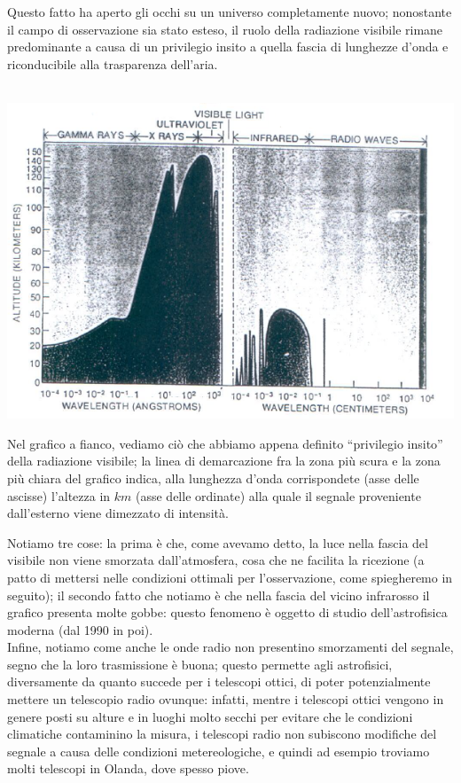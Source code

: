 Questo fatto ha aperto gli occhi su un universo completamente nuovo; nonostante il campo di osservazione sia stato esteso, il ruolo della radiazione visibile rimane predominante a causa di un privilegio insito a quella fascia di lunghezze d'onda e riconducibile alla trasparenza dell'aria.
\\
\\
\begin{minipage}{.50\textwidth}
	\centering
	\includegraphics[width=1\textwidth]{Img/bertin_2.png}
\end{minipage}
\begin{minipage}{.50\textwidth}
	Nel grafico a fianco, vediamo ciò che abbiamo appena definito ``privilegio insito'' della radiazione visibile; la linea di demarcazione fra la zona più scura e la zona più chiara del grafico indica, alla lunghezza d'onda corrispondete (asse delle ascisse) l'altezza in $km$ (asse delle ordinate) alla quale il segnale proveniente dall'esterno viene dimezzato di intensità.
\end{minipage}

\vspace{0.2cm}

Notiamo tre cose: la prima è che, come avevamo detto, la luce nella fascia del visibile non viene smorzata dall'atmosfera, cosa che ne facilita la ricezione (a patto di mettersi nelle condizioni ottimali per l'osservazione, come spiegheremo in seguito); il secondo fatto che notiamo è che nella fascia del vicino infrarosso il grafico presenta molte gobbe: questo  fenomeno è oggetto di studio dell'astrofisica moderna (dal 1990 in poi).\\
Infine, notiamo come anche le onde radio non presentino smorzamenti del segnale, segno che la loro trasmissione è buona; questo permette agli astrofisici, diversamente da quanto succede per i telescopi ottici, di poter potenzialmente mettere un telescopio radio ovunque: infatti, mentre i telescopi ottici vengono in genere posti su alture e in luoghi molto secchi per evitare che le condizioni climatiche contaminino la misura, i telescopi radio non subiscono modifiche del segnale a causa delle condizioni metereologiche, e quindi ad esempio troviamo molti telescopi in Olanda, dove spesso piove.

